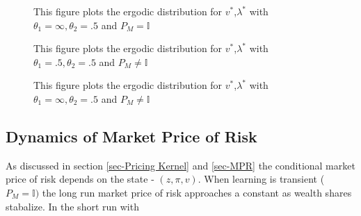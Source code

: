 \documentclass[12pt]{article}
\begin{document}
\begin{figure}[htbp]
\centering
{}
\caption{\small {This figure plots the ergodic distribution for $v^*$,$\lambda^*$ with $\theta_1=\infty,\theta_2 =.5$ and $P_M=\mathbb{I}$}}
\label{fig:SS_theta_1_infty_transitory}
\end{figure} 



\begin{figure}[htbp]
\centering
{}
\caption{\small {This figure plots the ergodic distribution for $v^*$,$\lambda^*$ with $\theta_1=.5,\theta_2 =.5$ and $P_M\neq \mathbb{I}$}}
\label{fig:SS_theta_1_finite_persistent}
\end{figure} 



\begin{figure}[htbp]
\centering
{}
\caption{\small {This figure plots the ergodic distribution for $v^*$,$\lambda^*$ with $\theta_1=\infty,\theta_2 =.5$ and $P_M\neq \mathbb{I}$}}
\label{fig:SS_theta_1_infty_persistent}
\end{figure} 





\subsection{Dynamics of Market Price of Risk}
As discussed in section \ref{sec-Pricing Kernel}  and \ref{sec-MPR} the conditional market price of risk depends on the state - $(z,\pi,v)$. When learning is transient ($P_M=\mathbb{I})$ the long run market price of risk approaches a constant as wealth shares stabalize. In the short run with
\end{document}
